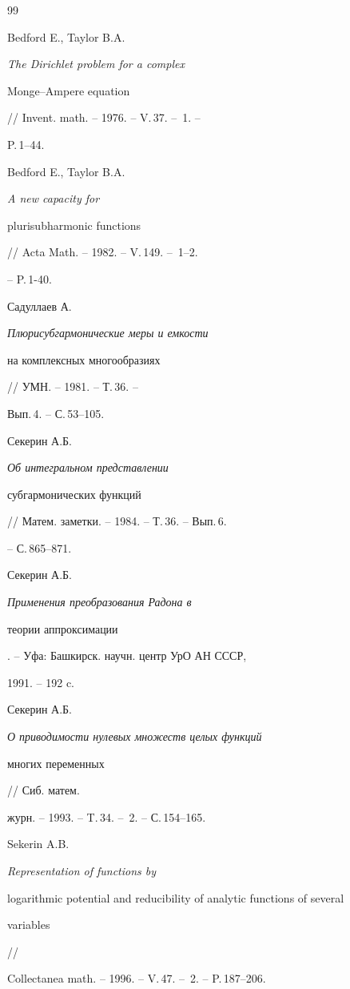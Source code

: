 \begin{thebibliography}{99}







Bedford E., Taylor B.A. {\em The Dirichlet problem for a complex 


Monge--Ampere equation} // Invent. math. -- 1976. -- V.\,37. -- \No\,1. -- 


P.\,1--44.  




Bedford E., Taylor B.A. {\em A new capacity for 


plurisubharmonic functions} // Acta Math. -- 1982. -- V.\,149. -- \No\,1--2. 


-- P.\,1-40.




Садуллаев А. {\em Плюрисубгармонические меры и емкости 


на комплексных многообразиях} // УМН. -- 1981. -- Т.\,36. -- 


Вып.\,4. -- С.\,53--105.




Секерин А.Б. {\em Об интегральном представлении 


субгармонических функций} // Матем. заметки. -- 1984. -- Т.\,36. -- Вып.\,6. 


-- С.\,865--871. 




Секерин А.Б. {\em Применения преобразования Радона в 


теории аппроксимации}. -- Уфа: Башкирск. научн. центр УрО АН СССР, 


1991. -- 192 c. 




Секерин А.Б. {\em О приводимости нулевых множеств целых функций 


многих переменных} // Сиб. матем. 


журн. -- 1993. -- T.\,34. -- \No\,2. -- С.\,154--165.




Sekerin A.B. {\em Representation of functions by 


logarithmic potential and reducibility of analytic functions of several 


variables} //


Collectanea math. -- 1996. -- V.\,47. -- \No\,2. -- P.\,187--206.



\end{thebibliography}
